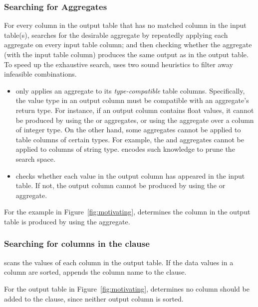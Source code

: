 
\subsubsection{Searching for Aggregates}
\label{sec:agg_search}

For every column in the output table that has no matched
column in the input table(s),
\ourtool searches for the desirable aggregate by
repeatedly applying each aggregate on
every input table column; and then checking whether
the aggregate (with the input table column) produces the same output 
as in the output table. To speed up the exhaustive search,
\ourtool uses two sound heuristics to filter away infeasible
combinations.


\begin{itemize}
\item \ourtool only applies an aggregate
to its \textit{type-compatible} table columns. Specifically,
the value type in an output column must be compatible with an
aggregate's return type. For instance, if an output column
contains float values, it cannot be produced by using the 
or  aggregates, or 
using the  aggregate over a column of integer type.
On the other hand, some aggregates cannot be applied to
table columns of certain types. For example, the 
and  aggregates cannot be applied to columns of string type.
\ourtool encodes such knowledge to prune the search space.

\item \ourtool checks whether each value in the output
column has appeared in the input table. If not, the
output column cannot be produced by using
the  or  aggregate.
\end{itemize}

For the example in Figure~\ref{fig:motivating}, \ourtool
determines the  column in the output
table is produced by using the  aggregate.



\subsubsection{Searching for columns in the  clause}
\label{sec:orderby}
\ourtool scans the values of each column in the output table. If
the data values in a column are sorted, \ourtool
appends the column name to the  clause.

For the output table in Figure~\ref{fig:motivating}, \ourtool
determines no column should be added to the  clause,
since neither output column is sorted.

